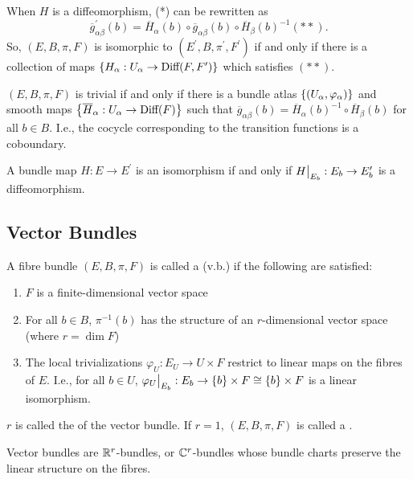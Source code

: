 \documentclass[main.tex]{subfiles}
\begin{document}
\begin{note}
When $H$ is a diffeomorphism, (*) can be rewritten as
\[
\overline{g}^\prime_{\alpha\beta}(b) = \overline{H}_\alpha(b) \circ \overline{g}_{\alpha\beta}(b) \circ \overline{H}_{\beta}(b)^{-1} (**).
\]
So, $(E, B, \pi, F)$ is isomorphic to $(E^\prime, B, \pi^\prime, F^\prime )$ if and only if there is a collection of maps $\left\{H_\alpha: U_\alpha  \to \text{Diff}(F, F^\prime) \right\}$ which satisfies $(**)$.
\end{note}

\begin{cor}
$(E, B, \pi, F)$ is trivial if and only if there is a bundle atlas $\left\{ \left( U_\alpha, \varphi_\alpha  \right)\right\}$ and smooth maps $\left\{\overline{H}_\alpha : U_\alpha \to \text{Diff}(F)\right\}$ such that $\overline{g}_{\alpha\beta}(b) = \overline{H}_\alpha(b)^{-1} \circ \overline{H}_\beta(b)$ for all $b \in B$. I.e., the cocycle corresponding to the transition functions is a coboundary.
\end{cor}

\begin{thm}
A bundle map $H : E \to E^\prime$ is an isomorphism if and only if $H\big|_{E_b} : E_b \to E_b^\prime$ is a diffeomorphism.
\end{thm}

\subsection{Vector Bundles}

\begin{defn}
A fibre bundle $(E,B, \pi, F)$ is called a  (v.b.) if the following are satisfied:
\begin{enumerate}[(i.)]
    \item $F$ is a finite-dimensional vector space
    \item For all $b \in B$, $\pi^{-1}(b)$ has the structure of an $r$-dimensional vector space (where $r = \dim F$)
    \item The local trivializations $\varphi_U: E_U \to U \times F$ restrict to linear maps on the fibres of $E$. I.e., for all $b \in U$, $\varphi_U\big|_{E_b} : E_b \to \left\{b\right\} \times F \cong \left\{b\right\} \times F$ is a linear isomorphism.
\end{enumerate}
$r$ is called the  of the vector bundle. If $r=1$, $(E, B, \pi, F)$ is called a .
\end{defn}

\begin{note}
Vector bundles are $\mathbb{R}^r$-bundles, or $\mathbb{C}^r$-bundles whose bundle charts preserve the linear structure on the fibres.
\end{note}
\end{document}
